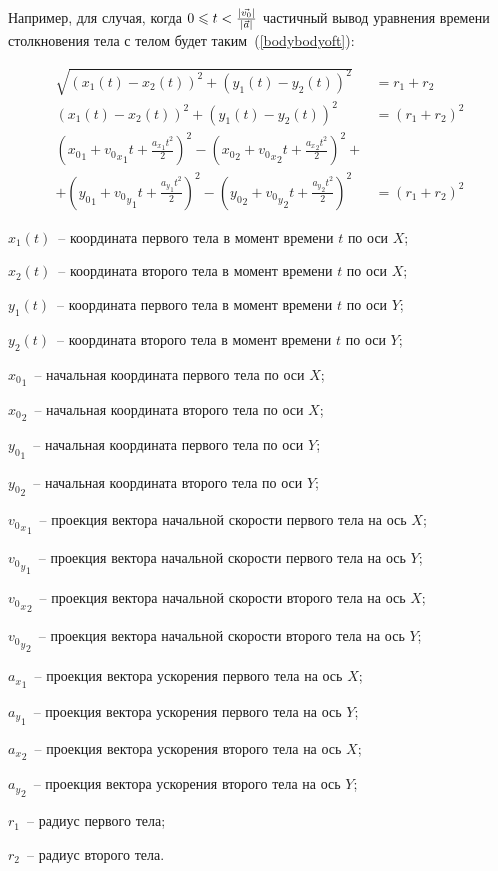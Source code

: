 Например, для случая, когда \(0 \leqslant t < \frac{\left|\vec{v_0}\right|}{\left|\vec{a}\right|}\) частичный вывод уравнения времени столкновения тела с телом будет таким~(\ref{bodybodyoft}):

\begin{align}\label{bodybodyoft}
  \sqrt{(x_1(t) - x_2(t))^2 + (y_1(t) - y_2(t))^2}        & = r_1 + r_2 \nonumber     \\
  (x_1(t) - x_2(t))^2 + (y_1(t) - y_2(t))^2               & = (r_1 + r_2)^2 \nonumber \\
  ({x_0}_1 + {{v_0}_x}_1 t + \frac{{a_x}_1 t^2}{2})^2
  - ({x_0}_2 + {{v_0}_x}_2 t + \frac{{a_x}_2 t^2}{2})^2 + & \nonumber                 \\
  + ({y_0}_1 + {{v_0}_y}_1 t + \frac{{a_y}_1 t^2}{2})^2
  - ({y_0}_2 + {{v_0}_y}_2 t + \frac{{a_y}_2 t^2}{2})^2   & = (r_1 + r_2)^2
\end{align}

\begin{Underequation}
  \(x_1(t)\)~-- координата первого тела в момент времени \(t\) по оси \(X\);

  \(x_2(t)\)~-- координата второго тела в момент времени \(t\) по оси \(X\);

  \(y_1(t)\)~-- координата первого тела в момент времени \(t\) по оси \(Y\);

  \(y_2(t)\)~-- координата второго тела в момент времени \(t\) по оси \(Y\);

  \({x_0}_1\)~-- начальная координата первого тела по оси \(X\);

  \({x_0}_2\)~-- начальная координата второго тела по оси \(X\);

  \({y_0}_1\)~-- начальная координата первого тела по оси \(Y\);

  \({y_0}_2\)~-- начальная координата второго тела по оси \(Y\);

  \({{v_0}_x}_1\)~-- проекция вектора начальной скорости первого тела на ось \(X\);

  \({{v_0}_y}_1\)~-- проекция вектора начальной скорости первого тела на ось \(Y\);

  \({{v_0}_x}_2\)~-- проекция вектора начальной скорости второго тела на ось \(X\);

  \({{v_0}_y}_2\)~-- проекция вектора начальной скорости второго тела на ось \(Y\);

  \({a_x}_1\)~-- проекция вектора ускорения первого тела на ось \(X\);

  \({a_y}_1\)~-- проекция вектора ускорения первого тела на ось \(Y\);

  \({a_x}_2\)~-- проекция вектора ускорения второго тела на ось \(X\);

  \({a_y}_2\)~-- проекция вектора ускорения второго тела на ось \(Y\);

  \(r_1\)~-- радиус первого тела;

  \(r_2\)~-- радиус второго тела.
\end{Underequation}

